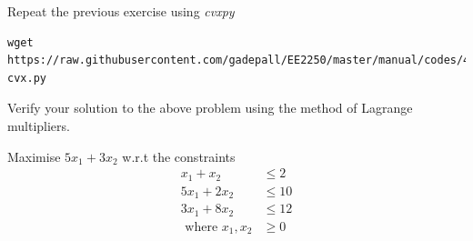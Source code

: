 \documentclass[journal,12pt,twocolumn]{IEEEtran}
\begin{document}
\begin{problem}
Repeat the previous exercise using {\em cvxpy}
\end{problem}
\solution
\begin{lstlisting}
wget https://raw.githubusercontent.com/gadepall/EE2250/master/manual/codes/4.2-cvx.py
\end{lstlisting}

\begin{problem}
	Verify your solution to the above problem using the method of Lagrange multipliers.
\end{problem}
%
\begin{problem}
	 Maximise $5x_1 + 3x_2$ w.r.t the constraints
	 \begin{align}
	 x_1 + x_2 &\leq 2 \nonumber\\
	 5x_1 + 2x_2 &\leq 10 \nonumber\\
	 3x_1 + 8x_2 &\leq 12 \nonumber\\
	 \text{ where } x_1,x_2 &\geq 0 \nonumber
	 \end{align}	
\end{problem}
\end{document}
